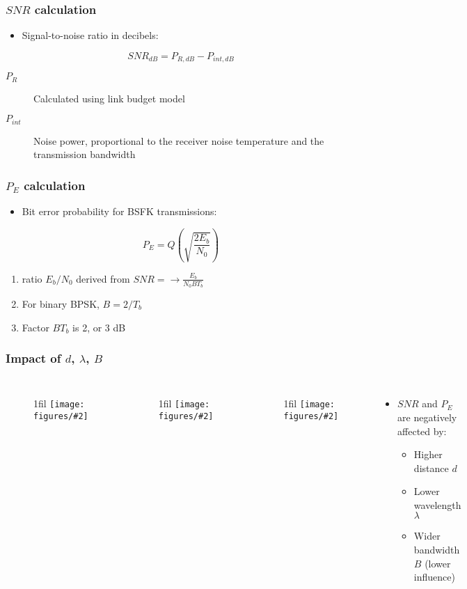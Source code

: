 \documentclass{beamer}
\makeatletter
\newcommand*{\centerfloat}{%
  \parindent \z@
  \leftskip \z@ \@plus 1fil \@minus \textwidth
  \rightskip\leftskip
  \parfillskip \z@skip}
\newcommand{\figNoCapt}[2]{
  \begin{figure}[H]
  \centerfloat
    \texttt{[image: figures/\#2]}
  \end{figure}
}
\makeatother
\begin{document}
\begin{frame}
	\frametitle{$SNR$ calculation}
	\begin{itemize}
		\item Signal-to-noise ratio in decibels:
	\end{itemize}
	\begin{equation}
		{SNR}_{dB} = P_{R, dB} - P_{int, dB}
	\end{equation}
	\begin{description}
		\item[$P_R$] Calculated using link budget model
		\item[$P_{int}$] Noise power, proportional to the receiver noise temperature and the transmission bandwidth
	\end{description}
\end{frame}

\begin{frame}
	\frametitle{$P_E$ calculation}
	\begin{itemize}
		\item Bit error probability for BSFK transmissions:
	\end{itemize}
	\begin{equation}
		P_E = Q\left(\sqrt{\frac{2E_b}{N_0}}\right)
	\end{equation}
	\begin{enumerate}
		\item ratio $E_b / N_0$ derived from $SNR = \rightarrow \frac{E_b}{N_0 B T_b}$
		\item For binary BPSK, $B = 2/T_b$
		\item Factor $B T_b$ is 2, or 3 dB
	\end{enumerate}
\end{frame}

\begin{frame}
	\frametitle{Impact of $d$, $\lambda$, $B$}
	\begin{columns}
			\figNoCapt{2.75cm}{d_lambda.png}
			\figNoCapt{2.75cm}{lambda_b.png}
			\figNoCapt{2.75cm}{d_b.png}
			\begin{itemize}
				\item $SNR$ and $P_E$ are negatively affected by:
				\begin{itemize}
					\item Higher distance $d$
					\item Lower wavelength $\lambda$
					\item Wider bandwidth $B$ (lower influence)
				\end{itemize}
			\end{itemize}
	\end{columns}
\end{frame}
\end{document}
